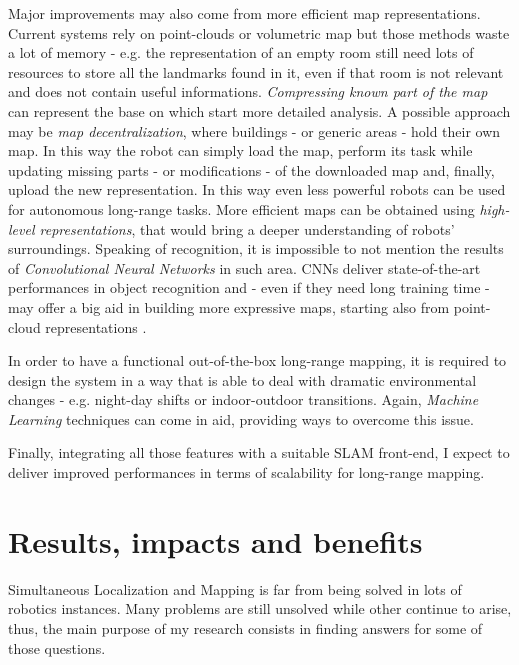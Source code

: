 \documentclass[10pt,a4paper, notitlepage]{report}
\begin{document}
Major improvements may also come from more efficient map representations. Current systems rely on point-clouds or volumetric map but those methods waste a lot of memory - e.g. the representation of an empty room still need lots of resources to store all the landmarks found in it, even if that room is not relevant and does not contain useful informations. \textit{Compressing known part of the map} \cite{lynen2015getoutofmylab} can represent the base on which start more detailed analysis. A possible approach may be \textit{map decentralization}, where buildings - or generic areas - hold their own map. In this way the robot can simply load the map, perform its task while updating missing parts - or modifications - of the downloaded map and, finally, upload the new representation. In this way even less powerful robots can be used for autonomous long-range tasks. More efficient maps can be obtained using \textit{high-level representations}, that would bring a deeper understanding of robots' surroundings. Speaking of recognition, it is impossible to not mention the results of \textit{Convolutional Neural Networks} \cite{krizhevsky2012alexnet} in such area. CNNs deliver state-of-the-art performances in object recognition and - even if they need long training time - may offer a big aid in building more expressive maps, starting also from point-cloud representations \cite{maturana2015voxnet}.

In order to have a functional out-of-the-box long-range mapping, it is required to design the system in a way that is able to deal with dramatic environmental changes - e.g. night-day shifts or indoor-outdoor transitions. Again, \textit{Machine Learning} techniques can come in aid, providing ways to overcome this issue.

Finally, integrating all those features with a suitable SLAM front-end, I expect to deliver improved performances in terms of scalability for long-range mapping.

\section*{Results, impacts and benefits}
Simultaneous Localization and Mapping is far from being solved in lots of robotics instances. Many problems are still unsolved while other continue to arise, thus, the main purpose of my research consists in finding answers for some of those questions. 
\end{document}
